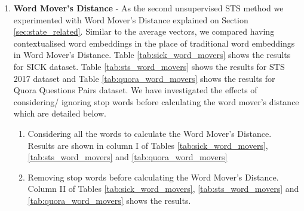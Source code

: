 \begin{enumerate}
	
	\item \textbf{Word Mover's Distance} - As the second unsupervised STS method we experimented with Word Mover's Distance explained on Section \ref{sec:state_related}. Similar to the average vectors, we compared having contextualised word embeddings in the place of traditional word embeddings in Word Mover's Distance. Table \ref{tab:sick_word_movers} shows the results for SICK dataset. Table \ref{tab:sts_word_movers} shows the results for STS 2017 dataset and Table \ref{tab:quora_word_movers} shows the results for Quora Questions Pairs dataset. We have investigated the effects of considering/ ignoring stop words before calculating the word mover's distance which are detailed below. 
	
	\begin{enumerate}
		\item Considering all the words to calculate the Word Mover's Distance. Results are shown in column I of Tables \ref{tab:sick_word_movers}, \ref{tab:sts_word_movers} and \ref{tab:quora_word_movers}
		\item Removing stop words before calculating the Word Mover's Distance. Column II of Tables \ref{tab:sick_word_movers}, \ref{tab:sts_word_movers} and \ref{tab:quora_word_movers} shows the results. 
	\end{enumerate} 
	
	

\begin{table}[htb]
	\centering
\end{table}
\end{enumerate}
